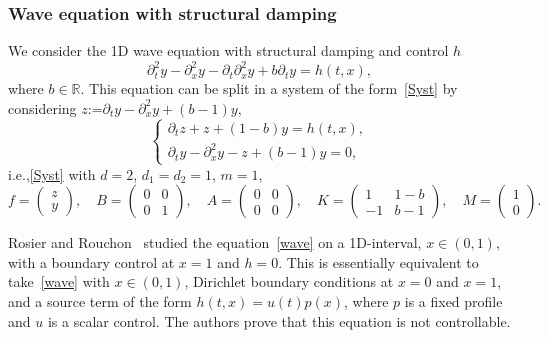 \documentclass[11pt]{article}
\newcommand{\ie}{i.e.,\xspace}
\theoremstyle{plain}
\theoremstyle{definition}
\theoremstyle{remark}
\newcommand{\set}{\mathbb}
\newcommand{\R}{} %
\renewcommand{\R}{\set{R}}
\newcommand{\coloneqq}{\mathrel{\mathord{:}\mathord=}}
\begin{document}
\subsubsection{Wave equation with structural damping}
We consider the 1D wave equation with structural damping and control $h$\vspace*{-3pt}\enlargethispage{\baselineskip}%
\begin{equation} \label{wave}
\partial_t^2 y - \partial_x^2 y -\partial_t\partial_x^2y + b \partial_t y = h(t,x),
\end{equation}
where $b\in\R$. This equation can be split in a system of the form~\eqref{Syst} by considering $z\coloneqq \partial_t y - \partial_x^2 y+(b-1)y$,\vspace*{-3pt}
\begin{equation} \label{wave_syst}
\begin{cases}
\partial_t z+z+(1-b)y= h(t,x), \\
\partial_t y-\partial_x^2 y -z + (b-1)y =0,
\end{cases}
\end{equation}
\ie \eqref{Syst} with $d=2$, $d_1=d_2=1$, $m=1$,\vspace*{-3pt}
\begin{equation} \label{wave_matrix}
f=\begin{pmatrix}
z \\ y
\end{pmatrix}, \quad
B=\begin{pmatrix}
0 & 0 \\ 0 & 1
\end{pmatrix}, \quad
A=\begin{pmatrix}
0 & 0 \\ 0 & 0
\end{pmatrix}, \quad
K=\begin{pmatrix}
1 & 1-b \\ -1 & b-1
\end{pmatrix}, \quad
M=\begin{pmatrix}
1 \\ 0
\end{pmatrix}.
\end{equation}

Rosier and Rouchon~\cite{rosier_2007} studied the equation~\eqref{wave} on a 1D-interval, $x\in (0,1)$, with a boundary control at $x=1$ and $h=0$. This is essentially equivalent to take~\eqref{wave} with $x\in(0,1)$, Dirichlet boundary conditions at $x=0$ and $x=1$, and a source term of the form $h(t,x)=u(t)p(x)$, where $p$ is a fixed profile and $u$ is a scalar control. The authors prove that this equation is not controllable.
\end{document}
